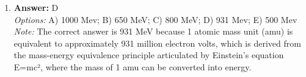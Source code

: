 \documentclass[12pt]{article}
\begin{document}
\begin{enumerate}[label=\arabic*.]
\\ \textit{Note:} When a wave transitions from shallow water to deep water, the frequency remains constant while the wavelength and speed increase due to the deeper water allowing for faster wave propagation, as described by the wave speed equation v = fλ, where v is speed, f is frequency, and λ is wavelength.
\item \textbf{Answer:} D
\\ \textit{Options:} A) 1000 Mev; B) 650 MeV; C) 800 MeV; D) 931 Mev; E) 500 Mev
\\ \textit{Note:} The correct answer is 931 MeV because 1 atomic mass unit (amu) is equivalent to approximately 931 million electron volts, which is derived from the mass-energy equivalence principle articulated by Einstein's equation E=mc², where the mass of 1 amu can be converted into energy.
\end{enumerate}
\end{document}
